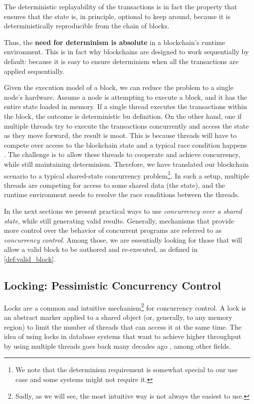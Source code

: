 \begin{remark}
	The deterministic replayability of the transactions is in fact the property that ensures that the
	state is, in principle, optional to keep around, because it is deterministically reproducible from
	the chain of blocks.
\end{remark}

Thus, the \textbf{need for determinism is absolute} in a blockchain's runtime environment. This is
in fact why blockchains are designed to work sequentially by default: because it is easy to ensure
determinism when all the transactions are applied sequentially.

Given the execution model of a block, we can reduce the problem to a single node's hardware. Assume
a node is attempting to execute a block, and it has the entire state loaded in memory. If a single
thread executes the transactions within the block, the outcome is deterministic bu definition. On
the other hand, one if multiple threads try to execute the transactions concurrently and access the
state as they move forward, the result is moot. This is because threads will have to compete over
access to the blockchain state and a typical race condition happens \cite{14:00-17:00ISOIEC9899}.
The challenge is to allow these threads to cooperate and achieve concurrency, while still
maintaining determinism. Therefore, we have translated our blockchain scenario to a typical
shared-state concurrency problem\footnote{We note that the determinism requirement is somewhat
special to our use case and some systems might not require it.}. In such a setup, multiple threads
are competing for access to some shared data (the state), and the runtime environment needs to
resolve the race conditions between the threads.

In the next sections we present practical ways to use \textit{concurrency over a shared state},
while still generating valid results. Generally, mechanisms that provide more control over the
behavior of concurrent programs are referred to as  \textit{concurrency control}. Among those, we
are essentially looking for those that will allow a valid block to be authored and re-executed, as
defined in \ref{def:valid_block}.

\subsection{Locking: Pessimistic Concurrency Control} \label{chap_bg:subsec:lock}
Locks are a common and intuitive mechanism\footnote{Sadly, as we will see, the most intuitive way is not always
the easiest to use.} for concurrency control. A lock is an abstract marker applied to a shared
object (or, generally, to any memory region) to limit the number of threads that can access it at the
same time. The idea of using locks in database systems that want to
achieve higher throughput by using multiple threads goes back many decades ago
\cite{kedemControllingConcurrencyUsing1979, morrisPerformanceAnalysisLocking1985}, among other fields.


